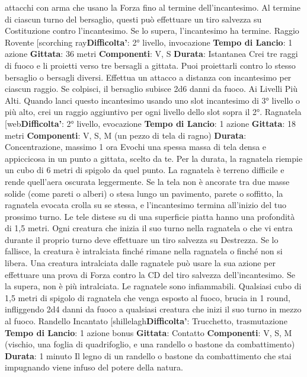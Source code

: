 \begin{multicols}{2}
attacchi con arma che usano la Forza fino al termine
dell’incantesimo.
Al termine di ciascun turno del bersaglio, questi può
effettuare un tiro salvezza su Costituzione contro
l’incantesimo. Se lo supera, l’incantesimo ha termine.
Raggio Rovente
[scorching ray\textbf{Difficolta'}:
2° livello, invocazione
\textbf{Tempo di Lancio}: 1 azione
\textbf{Gittata}: 36 metri
\textbf{Componenti}: V, S
\textbf{Durata}: Istantanea
Crei tre raggi di fuoco e li proietti verso tre bersagli a
gittata. Puoi proiettarli contro lo stesso bersaglio o
bersagli diversi.
Effettua un attacco a distanza con incantesimo per
ciascun raggio. Se colpisci, il bersaglio subisce 2d6
danni da fuoco.
Ai Livelli Più Alti. Quando lanci questo incantesimo
usando uno slot incantesimo di 3° livello o più alto, crei
un raggio aggiuntivo per ogni livello dello slot sopra il
2°.
Ragnatela
[web\textbf{Difficolta'}:
2° livello, evocazione
\textbf{Tempo di Lancio}: 1 azione
\textbf{Gittata}: 18 metri
\textbf{Componenti}: V, S, M (un pezzo di tela di ragno)
\textbf{Durata}: Concentrazione, massimo 1 ora
Evochi una spessa massa di tela densa e appiccicosa
in un punto a gittata, scelto da te. Per la durata, la
ragnatela riempie un cubo di 6 metri di spigolo da quel
punto. La ragnatela è terreno difficile e rende quell’aera
oscurata leggermente.
Se la tela non è ancorate tra due masse solide (come
pareti o alberi) o stesa lungo un pavimento, parete o
soffitto, la ragnatela evocata crolla su se stessa, e
l’incantesimo termina all’inizio del tuo prossimo turno.
Le tele distese su di una superficie piatta hanno una
profondità di 1,5 metri.
Ogni creatura che inizia il suo turno nella ragnatela o
che vi entra durante il proprio turno deve effettuare un
tiro salvezza su Destrezza. Se lo fallisce, la creatura è
intralciata finché rimane nella ragnatela o finché non si
libera.
Una creatura intralciata dalle ragnatele può usare la
sua azione per effettuare una prova di Forza contro la
CD del tiro salvezza dell’incantesimo. Se la supera, non
è più intralciata.
Le ragnatele sono infiammabili. Qualsiasi cubo di 1,5
metri di spigolo di ragnatela che venga esposto al
fuoco, brucia in 1 round, infliggendo 2d4 danni da fuoco
a qualsiasi creatura che inizi il suo turno in mezzo al
fuoco.
Randello Incantato
[shillelagh\textbf{Difficolta'}:
Trucchetto, trasmutazione
\textbf{Tempo di Lancio}: 1 azione bonus
\textbf{Gittata}: Contatto
\textbf{Componenti}: V, S, M (vischio, una foglia di
quadrifoglio, e una randello o bastone da
combattimento)
\textbf{Durata}: 1 minuto
Il legno di un randello o bastone da combattimento che
stai impugnando viene infuso del potere della natura.

\end{multicols}
